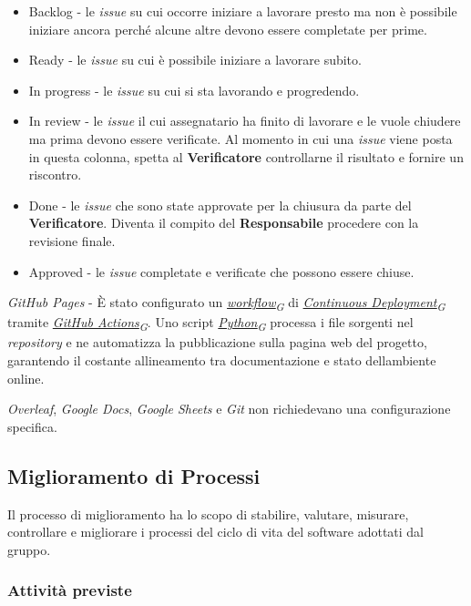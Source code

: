 \documentclass[12pt, a4paper]{article}
\newcommand{\urlglossario}{https://skynetunigroup.github.io/Code_Guardian/Documentazione/RTB/glossario_v1.0.0.pdf} %
\newcommand{\glo}[2]{\href{\urlglossario\#nameddest=#2}{#1\textsubscript{G}}}
\begin{document}
\begin{itemize}
\item
  Backlog - le \textit{issue} su cui occorre iniziare a lavorare presto ma non è possibile iniziare ancora perché alcune altre devono essere completate per prime.
 \item
  Ready - le \textit{issue} su cui è possibile iniziare a lavorare subito.
 \item
  In progress - le \textit{issue} su cui si sta lavorando e progredendo.
 \item
  In review - le \textit{issue} il cui assegnatario ha finito di lavorare e le vuole chiudere ma prima devono essere verificate. Al momento in cui una \textit{issue} viene posta in questa colonna, spetta al \textbf{Verificatore} controllarne il risultato e fornire un riscontro.
 \item
  Done - le \textit{issue} che sono state approvate per la chiusura da parte del \textbf{Verificatore}. Diventa il compito del \textbf{Responsabile} procedere con la revisione finale.
 \item
  Approved - le \textit{issue} completate e verificate che possono essere chiuse.
 \end{itemize}

\textit{GitHub Pages} - È stato configurato un \textit{\glo{workflow}{workflow}} di \textit{\glo{Continuous Deployment}{continuous-deployment}} tramite \textit{\glo{GitHub Actions}{github-actions}}. Uno script \textit{\glo{Python}{python}} processa i file sorgenti nel \textit{repository} e ne automatizza la pubblicazione sulla pagina web del progetto, garantendo il costante allineamento tra documentazione e stato dell\textquotesingle ambiente online.

 \textit{Overleaf}, \textit{Google Docs}, \textit{Google Sheets} e \textit{Git} non richiedevano una configurazione specifica.

 \subsection{Miglioramento di Processi}

Il processo di miglioramento ha lo scopo di stabilire, valutare, misurare, controllare e migliorare i processi del ciclo di vita del software adottati dal gruppo.

 \subsubsection{Attività previste}
\end{document}
